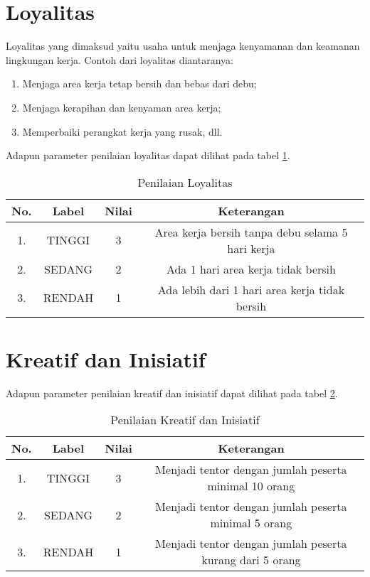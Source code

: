 \section{Loyalitas}
Loyalitas yang dimaksud yaitu usaha untuk menjaga kenyamanan dan keamanan lingkungan kerja. Contoh dari loyalitas diantaranya:
\begin{enumerate}
\item Menjaga area kerja tetap bersih dan bebas dari debu;
\item Menjaga kerapihan dan kenyaman area kerja;
\item Memperbaiki perangkat kerja yang rusak, dll.
\end{enumerate}
Adapun parameter penilaian loyalitas dapat dilihat pada tabel \ref{tab:nilailoyalitas}.

\begin{table}[h]
\caption{Penilaian Loyalitas}
\centering
\begin{tabular}{|c|c|c|c|}
\hline
\textbf{No.}&\textbf{Label}&\textbf{Nilai}&\textbf{Keterangan}\\
\hline
1.&TINGGI&3&Area kerja bersih tanpa debu selama 5 hari kerja\\
\hline
2.&SEDANG&2&Ada 1 hari area kerja tidak bersih\\
\hline
3.&RENDAH&1&Ada lebih dari 1 hari area kerja tidak bersih\\
\hline
\end{tabular}
\label{tab:nilailoyalitas}
\end{table}

\section{Kreatif dan Inisiatif}

Adapun parameter penilaian kreatif dan inisiatif dapat dilihat pada tabel \ref{tab:nilaikreatifinisiatif}.

\begin{table}[h]
\caption{Penilaian Kreatif dan Inisiatif}
\centering
\begin{tabular}{|c|c|c|c|}
\hline
\textbf{No.}&\textbf{Label}&\textbf{Nilai}&\textbf{Keterangan}\\
\hline
1.&TINGGI&3&Menjadi tentor dengan jumlah peserta minimal 10 orang\\
\hline
2.&SEDANG&2&Menjadi tentor dengan jumlah peserta minimal 5 orang\\
\hline
3.&RENDAH&1&Menjadi tentor dengan jumlah peserta kurang dari 5 orang\\
\hline
\end{tabular}
\label{tab:nilaikreatifinisiatif}
\end{table}

